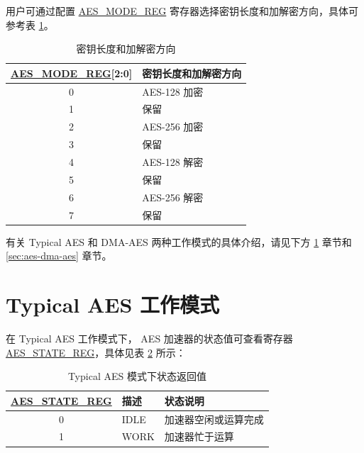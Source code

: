 \documentclass[main\_\_CN.tex]{subfiles}
\begin{document}
用户可通过配置 \hyperref[regdesc:AESMODEREG]{AES\_MODE\_REG} 寄存器选择密钥长度和加解密方向，具体可参考表 \ref{tab:aes-operation}。

\begin{longtable}[c]{ | c | l | }
\caption{密钥长度和加解密方向}
\label{tab:aes-operation}
\\\hline
\rowcolor{lightgray}
\textbf{\hyperref[regdesc:AESMODEREG]{AES\_MODE\_REG}[2:0]}     & \textbf{密钥长度和加解密方向}\\
    \hline
    0                   & AES-128 加密    \\
    \hline
    1                   & 保留    \\
    \hline
    2                   & AES-256 加密    \\
    \hline
    3                   & 保留    \\
    \hline
    4                   & AES-128 解密    \\
    \hline
    5                   & 保留    \\
    \hline
    6                   & AES-256 解密    \\
    \hline
    7                   & 保留    \\
    \hline
\end{longtable}

有关 Typical AES 和 DMA-AES 两种工作模式的具体介绍，请见下方 \ref{sec:aes-typical-modes} 章节和 \ref{sec:aes-dma-aes} 章节。


\clearpage
\section{Typical AES 工作模式}\label{sec:aes-typical-modes}

在 Typical AES 工作模式下，
AES 加速器的状态值可查看寄存器 \hyperref[regdesc:AESSTATEREG]{AES\_STATE\_REG}，具体见表 \ref{tab:aes-state-value-typical} 所示：

\begin{longtable}[c]{ |c | l | l | }
\caption{Typical AES 模式下状态返回值}
\label{tab:aes-state-value-typical}
\\\hline
\rowcolor{lightgray}
\textbf{\hyperref[regdesc:AESSTATEREG]{AES\_STATE\_REG}} & \textbf{描述} &  \textbf{状态说明} \\ \hline

    0                   & IDLE      &   加速器空闲或运算完成\\ \hline
    1                   & WORK      &   加速器忙于运算     \\ \hline
\end{longtable}
\end{document}
